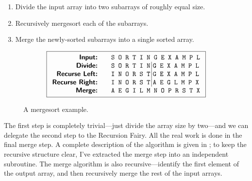 \begin{enumerate}
\item Divide the input array into two subarrays of roughly equal size.

\item Recursively mergesort each of the subarrays.

\item Merge the newly-sorted subarrays into a single sorted array.
\end{enumerate}

\begin{figure}[ht]
\centering
\[
\fbox{$\begin{array}{r@{\qquad}l}
\mbox{\textsf{\textbf{Input:}}} & \mbox{\texttt{S O R T I N G E X A M P L}}\\
\mbox{\textsf{\textbf{Divide:}}} & \mbox{\texttt{S O R T I N}\,\vrule height 8.6bp depth 3.4bp\,\texttt{G E X A M P L}}\\
\mbox{\textsf{\textbf{Recurse Left:}}} & \mbox{\texttt{I N O R S T}\,\vrule height 8.6bp depth 3.4bp\,\texttt{G E X A M P L}}\\
\mbox{\textsf{\textbf{Recurse Right:}}} & \mbox{\texttt{I N O R S T}\,\vrule height 8.6bp depth 3.4bp\,\texttt{A E G L M P X}}\\
\mbox{\textsf{\textbf{Merge:}}} & \mbox{\texttt{A E G I L M N O P R S T X}}
\end{array}$}
\]
\caption{A mergesort example.}
\label{fig:1.5}
\end{figure}
The first step is completely trivial—just divide the array size by two—and we can delegate the second step to the Recursion Fairy. All the real work is done in the final merge step. A complete description of the algorithm is given in ; to keep the recursive structure clear, I’ve extracted the merge step into an independent subroutine. The merge algorithm is also recursive—identify the first element of the output array, and then recursively merge the rest of the input arrays.

